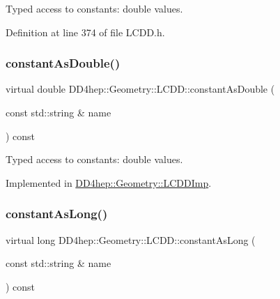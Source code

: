 Typed access to constants\+: double values. 



Definition at line 374 of file L\+C\+D\+D.\+h.

\hypertarget{class_d_d4hep_1_1_geometry_1_1_l_c_d_d_a9696a0bb5af8abd3667460a617d4dc83}{}\label{class_d_d4hep_1_1_geometry_1_1_l_c_d_d_a9696a0bb5af8abd3667460a617d4dc83} 
\subsubsection{\texorpdfstring{constant\+As\+Double()}{constantAsDouble()}}
{\footnotesize\ttfamily virtual double D\+D4hep\+::\+Geometry\+::\+L\+C\+D\+D\+::constant\+As\+Double (\begin{DoxyParamCaption}\item[{const std\+::string \&}]{name }\end{DoxyParamCaption}) const\hspace{0.3cm}{\ttfamily [pure virtual]}}



Typed access to constants\+: double values. 



Implemented in \hyperlink{class_d_d4hep_1_1_geometry_1_1_l_c_d_d_imp_adec48130368cda76cd52ebb6a792225b}{D\+D4hep\+::\+Geometry\+::\+L\+C\+D\+D\+Imp}.

\hypertarget{class_d_d4hep_1_1_geometry_1_1_l_c_d_d_a95370880f4063064af089b943b0e4ce2}{}\label{class_d_d4hep_1_1_geometry_1_1_l_c_d_d_a95370880f4063064af089b943b0e4ce2} 
\subsubsection{\texorpdfstring{constant\+As\+Long()}{constantAsLong()}}
{\footnotesize\ttfamily virtual long D\+D4hep\+::\+Geometry\+::\+L\+C\+D\+D\+::constant\+As\+Long (\begin{DoxyParamCaption}\item[{const std\+::string \&}]{name }\end{DoxyParamCaption}) const\hspace{0.3cm}{\ttfamily [pure virtual]}}



